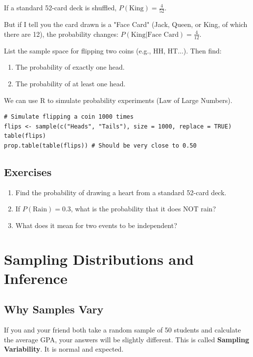 \documentclass[11pt,openany]{book}
\begin{document}
\begin{examplebox}
If a standard 52-card deck is shuffled, $P(\text{King}) = \frac{4}{52}$.

But if I tell you the card drawn is a "Face Card" (Jack, Queen, or King, of which there are 12), the probability changes:
$P(\text{King} | \text{Face Card}) = \frac{4}{12}$.
\end{examplebox}

\begin{byhand}
List the sample space for flipping two coins (e.g., HH, HT...). Then find:
\begin{enumerate}
    \item The probability of exactly one head.
    \item The probability of at least one head.
\end{enumerate}
\end{byhand}

\begin{rstudio}
We can use R to simulate probability experiments (Law of Large Numbers).
\begin{lstlisting}[style=rcode]
# Simulate flipping a coin 1000 times
flips <- sample(c("Heads", "Tails"), size = 1000, replace = TRUE)
table(flips)
prop.table(table(flips)) # Should be very close to 0.50
\end{lstlisting}
\end{rstudio}

\section{Exercises}
\begin{enumerate}
    \item Find the probability of drawing a heart from a standard 52-card deck.
    \item If $P(\text{Rain}) = 0.3$, what is the probability that it does NOT rain?
    \item What does it mean for two events to be independent?
\end{enumerate}

\chapter{Sampling Distributions and Inference}

\section{Why Samples Vary}
If you and your friend both take a random sample of 50 students and calculate the average GPA, your answers will be slightly different. This is called \textbf{Sampling Variability}. It is normal and expected.
\end{document}
